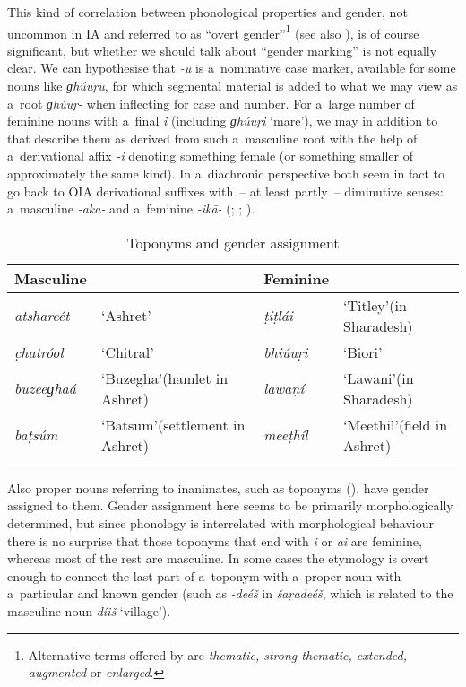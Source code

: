 This kind of correlation between phonological properties and gender, not uncommon in IA \citep[219]{masica1991} and referred to as ``overt gender''\footnote{Alternative terms offered by \citet[219]{masica1991} are \textit{thematic, strong thematic, extended, augmented} or \textit{enlarged}.} (see also \citealt[44, 62]{corbett1991}), is of course significant, but whether we should talk about ``gender marking'' is not equally clear. We can hypothesise that \textit{-u} is a~nominative case marker, available for some nouns like \textit{ɡhúuṛu}, for which segmental material is added to what we may view as a~root \textit{ɡhúuṛ-} when inflecting for case and number. For a~large number of feminine nouns with a~final \textit{i} (including \textit{ɡhúuṛi} `mare'), we may in addition to that describe them as derived from such a~masculine root with the help of a~derivational affix \textit{-i} denoting something female (or something smaller of approximately the same kind). In a~diachronic perspective both seem in fact to go back to OIA derivational suffixes with~-- at least partly~-- diminutive senses: a~masculine \textit{-aka-} and a~feminine \textit{-ikā-} (\citealt[222]{masica1991}; \citealt[15]{morgenstierne1941}; \citealt[29]{buddruss1967}).


\begin{table}[ht]
\caption{Toponyms and gender assignment}
\begin{tabularx}{\textwidth}{ l Q l Q }
\lsptoprule
Masculine &
&
Feminine &
\\\hline
\textit{atshareét} &
`Ashret' &
\textit{ṭiṭlái} &
`Titley'\newline (in Sharadesh)\\
\textit{c̣hatróol} &
`Chitral' &
\textit{bhiúuṛi} &
`Biori'\\
\textit{buzeeɡhaá} &
`Buzegha'\newline (hamlet in Ashret) &
\textit{lawaṇí} &
`Lawani'\newline (in Sharadesh)\\
\textit{baṭsúm} &
`Batsum'\newline (settlement in Ashret) &
\textit{meeṭhíl} &
`Meethil'\newline (field in Ashret)\\\lspbottomrule
\end{tabularx}
\label{tab:4-3}
\end{table}


Also proper nouns referring to inanimates, such as toponyms (), have gender assigned to them. Gender assignment here seems to be primarily morphologically determined, but since phonology is interrelated with morphological behaviour there is no surprise that those toponyms that end with \textit{i} or \textit{ai} are feminine, whereas most of the rest are masculine. In some cases the etymology is overt enough to connect the last part of a~toponym with a~proper noun with a~particular and known gender (such as \textit{-deéš} in \textit{šaṛadeéš}, which is related to the masculine noun \textit{díiš} `village').


